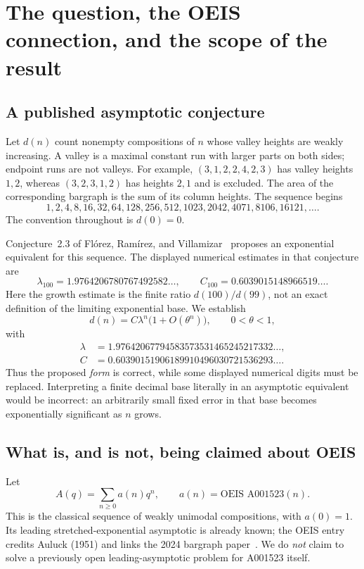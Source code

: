 \documentclass[11pt,a4paper]{article}
\numberwithin{equation}{section}
\theoremstyle{definition}\newtheorem{definition}[theorem]{Definition}
\theoremstyle{remark}\newtheorem{remark}[theorem]{Remark}
\begin{document}
\section{The question, the OEIS connection, and the scope of the result}

\subsection{A published asymptotic conjecture}
Let \(d(n)\) count nonempty compositions of \(n\) whose valley heights are
weakly increasing. A valley is a maximal constant run with larger parts
on both sides; endpoint runs are not valleys. For example,
\((3,1,2,2,4,2,3)\) has valley heights \(1,2\), whereas
\((3,2,3,1,2)\) has heights \(2,1\) and is excluded.
The area of the corresponding bargraph is the sum of its column heights.
The sequence begins
\[
1,2,4,8,16,32,64,128,256,512,1023,2042,4071,8106,16121,\ldots.
\]
The convention throughout is \(d(0)=0\).

Conjecture~2.3 of Fl\'orez, Ram\'irez, and Villamizar~\cite{FRV}
proposes an exponential equivalent for this sequence. The displayed
numerical estimates in that conjecture are
\begin{equation}\label{vmb:eq:published}
\lambda_{100}=1.9764206780767492582\ldots,
\qquad C_{100}=0.6039015148966519\ldots.
\end{equation}
Here the growth estimate is the finite ratio \(d(100)/d(99)\), not an
exact definition of the limiting exponential base. We establish
\begin{equation}\label{vmb:eq:main-intro}
d(n)=C\lambda^n\bigl(1+O(\theta^n)\bigr),\qquad 0<\theta<1,
\end{equation}
with
\begin{align*}
\lambda&=1.97642067794583573531465245217332\ldots,\\
C&=0.60390151906189910496030721536293\ldots.
\end{align*}
Thus the proposed \emph{form} is correct, while some displayed numerical
digits must be replaced. Interpreting a finite decimal base literally in
an asymptotic equivalent would be incorrect: an arbitrarily small fixed
error in that base becomes exponentially significant as \(n\) grows.

\subsection{What is, and is not, being claimed about OEIS}
Let
\begin{equation}\label{vmb:eq:A}
A(q)=\sum_{n\geq0}a(n)q^n,\qquad a(n)=\text{OEIS A001523}(n).
\end{equation}
This is the classical sequence of weakly unimodal compositions, with
\(a(0)=1\). Its leading stretched-exponential asymptotic is already
known; the OEIS entry credits Auluck (1951) and links the 2024 bargraph
paper~\cite{OEIS,FRV}. We do \emph{not} claim to solve a previously open
leading-asymptotic problem for A001523 itself.
\end{document}
